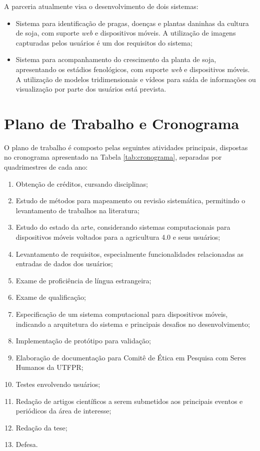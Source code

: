 \documentclass[12pt]{article}
\begin{document}
A parceria atualmente visa o desenvolvimento de dois sistemas:

\begin{itemize}
	\item Sistema para identificação de pragas, doenças e plantas daninhas da cultura de soja, com suporte \textit{web} e dispositivos móveis. A utilização de imagens capturadas pelos usuários é um dos requisitos do sistema;

	\item Sistema para acompanhamento do crescimento da planta de soja, apresentando os estádios fenológicos, com suporte \textit{web} e dispositivos móveis. A utilização de modelos tridimensionais e vídeos para saída de informações ou visualização por parte dos usuários está prevista.
\end{itemize}

\section{Plano de Trabalho e Cronograma}

O plano de trabalho é composto pelas seguintes atividades principais, dispostas no cronograma apresentado na Tabela \ref{tab:cronograma}, separadas por quadrimestres de cada ano:

\begin{enumerate}
	\item Obtenção de créditos, cursando disciplinas;
	\item Estudo de métodos para mapeamento ou revisão sistemática, permitindo o levantamento de trabalhos na literatura;
	\item Estudo do estado da arte, considerando sistemas computacionais para dispositivos móveis voltados para a agricultura 4.0 e seus usuários;
	\item Levantamento de requisitos, especialmente funcionalidades relacionadas as entradas de dados dos usuários;
	\item Exame de proficiência de língua estrangeira;
	\item Exame de qualificação;
	\item Especificação de um sistema computacional para dispositivos móveis, indicando a arquitetura do sistema e principais desafios no desenvolvimento;
	\item Implementação de protótipo para validação;
	\item Elaboração de documentação para Comitê de Ética em Pesquisa com Seres Humanos da UTFPR;
	\item Testes envolvendo usuários;
	\item Redação de artigos científicos a serem submetidos aos principais eventos e periódicos da área de interesse;
	\item Redação da tese;
	\item Defesa.
\end{enumerate}
\end{document}
